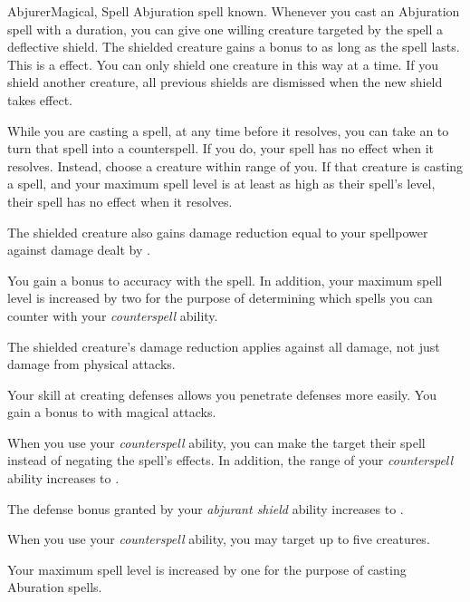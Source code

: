     \begin{feat}{Abjurer}{Magical, Spell}
        \featpre Abjuration spell known.
        \featben
         Whenever you cast an Abjuration spell with a duration, you can give one willing creature targeted by the spell a deflective shield.
        The shielded creature gains a  bonus to  as long as the spell lasts.
        This is a   effect.
        You can only shield one creature in this way at a time.
        If you shield another creature, all previous shields are dismissed when the new shield takes effect.

         While you are casting a spell, at any time before it resolves, you can take an  to turn that spell into a counterspell.
        If you do, your spell has no effect when it resolves.
        Instead, choose a creature within \rngmed range of you.
        If that creature is casting a spell, and your maximum spell level is at least as high as their spell's level, their spell has no effect when it resolves.

         The shielded creature also gains damage reduction equal to your spellpower against damage dealt by .

         You gain a  bonus to accuracy with the  spell.
        In addition, your maximum spell level is increased by two for the purpose of determining which spells you can counter with your \textit{counterspell} ability.

         The shielded creature's damage reduction applies against all damage, not just damage from physical attacks.

         Your skill at creating defenses allows you penetrate defenses more easily.
        You gain a  bonus to  with magical attacks.

         When you use your \textit{counterspell} ability, you can make the target  their spell instead of negating the spell's effects.
        In addition, the range of your \textit{counterspell} ability increases to \rnglong.

         The defense bonus granted by your \textit{abjurant shield} ability increases to .

         When you use your \textit{counterspell} ability, you may target up to five creatures.

         Your maximum spell level is increased by one for the purpose of casting Aburation spells.
    \end{feat}

